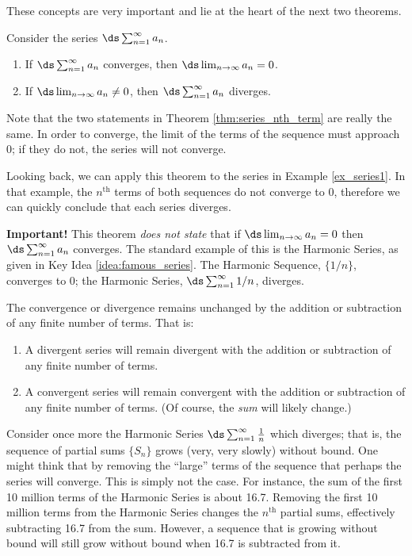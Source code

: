 These concepts are very important and lie at the heart of the next two theorems.

{Consider the series $\ds\sum_{n=1}^\infty a_n$. 
\begin{enumerate}
\item		If $\ds\sum_{n=1}^\infty a_n$ converges, then $\ds \lim_{n\to\infty}a_n =0$.
\item		If $\ds \lim_{n\to\infty}a_n \neq 0$, then $\ds\sum_{n=1}^\infty a_n$ diverges.
\end{enumerate}
}

Note that the two statements in Theorem \ref{thm:series_nth_term} are really the same. In order to converge, the limit of the terms of the sequence must approach 0; if they do not, the series will not converge. 

Looking back, we can apply this theorem to the series in Example \ref{ex_series1}. In that example, the $n^\text{th}$ terms of both sequences do not converge to 0, therefore we can quickly conclude that each series diverges.

\textbf{Important!} This theorem \emph{does not state} that if $\ds \lim_{n\to\infty} a_n = 0$ then $\ds \sum_{n=1}^\infty  a_n $ converges. The standard example of this is the Harmonic Series, as given in Key Idea \ref{idea:famous_series}. The Harmonic Sequence, $\{1/n\}$, converges to 0; the Harmonic Series, $\ds \sum_{n=1}^\infty 1/n$, diverges.

{The convergence or divergence remains unchanged by the addition or subtraction of any finite number of terms. That is:
	\begin{enumerate}
	\item		A divergent series will remain divergent with the addition or subtraction of any finite number of terms.
	\item		A convergent series will remain convergent with the addition or subtraction of any finite number of terms. (Of course, the \emph{sum} will likely change.)
	\end{enumerate}
}

Consider once more the Harmonic Series $\ds\sum_{n=1}^\infty  \frac1n$ which diverges; that is, the sequence of partial sums $\{S_n\}$ grows (very, very slowly) without bound. One might think that by removing the ``large'' terms of the sequence that perhaps the series will converge. This is simply not the case. For instance, the sum of the first 10 million terms of the Harmonic Series is about 16.7. Removing the first 10 million terms from the Harmonic Series changes the $n^\text{th}$ partial sums,  effectively subtracting 16.7 from the sum. However, a sequence that is growing without bound will still grow without bound when 16.7 is subtracted from it. 

